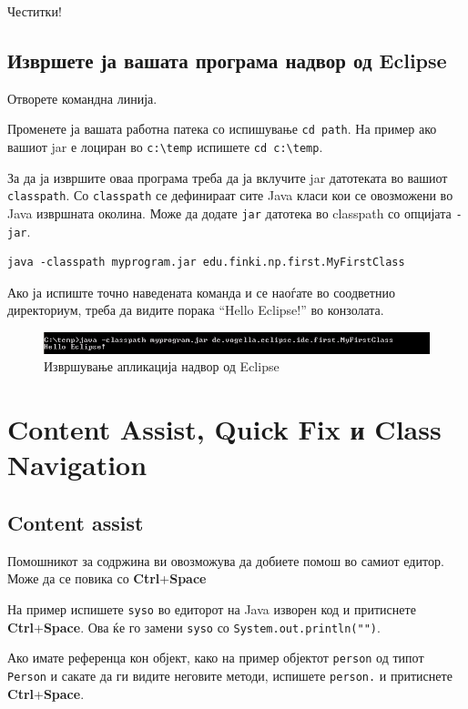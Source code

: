 Честитки! 

\subsection{Извршете ја вашата програма надвор од Eclipse}

Отворете командна линија.

Променете ја вашата работна патека со испишување \texttt{cd path}. На пример
ако вашиот jar е лоциран во \texttt{c:\textbackslash{}temp} испишете \texttt{cd c:\textbackslash{}temp}.

За да ја извршите оваа програма треба да ја вклучите jar датотеката во вашиот
\texttt{classpath}. Со \texttt{classpath} се дефинираат сите Java класи кои се
овозможени во Java извршната околина. Може да додате \texttt{jar} датотека во
classpath со опцијата \texttt{-jar}.

\begin{verbatim}
java -classpath myprogram.jar edu.finki.np.first.MyFirstClass 
\end{verbatim}

Ако ја испиште точно наведената команда и се наоѓате во соодветнио директориум,
треба да видите порака ``Hello Eclipse!'' во конзолата.

\begin{figure}
\centering
\includegraphics[scale=.5]{images/win}
\caption{Извршување апликација надвор од Eclipse}
\end{figure}

\section{Content Assist, Quick Fix и Class Navigation}

\subsection{Content assist}

Помошникот за содржина ви овозможува да добиете помош во самиот едитор. Може
да се повика со \textbf{Ctrl}+\textbf{Space}

На пример испишете \texttt{syso} во едиторот на Java изворен код и притиснете
\textbf{Ctrl}+\textbf{Space}. Ова ќе го замени \texttt{syso} со
\texttt{System.out.println("")}.

Ако имате референца кон објект, како на пример објектот \texttt{person} од типот
\texttt{Person} и сакате да ги видите неговите методи, испишете \texttt{person.}
и притиснете \textbf{Ctrl}+\textbf{Space}.

